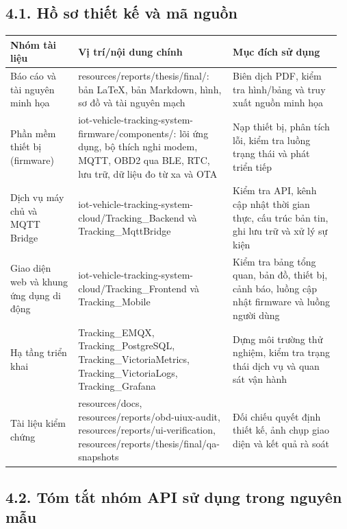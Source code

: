 \documentclass[a4paper]{extarticle}
\newcounter{none} %
\newcommand{\thesisterm}[1]{{\rmfamily #1}}
\begin{document}
\subsection{4.1. Hồ sơ thiết kế và mã nguồn}\label{app4-source-materials-cap-nhat}

{\def\LTcaptype{none} %
\begin{longtable}{|L{0.205\linewidth}|L{0.435\linewidth}|L{0.320\linewidth}|}
\hline
\textbf{Nhóm tài liệu} & \textbf{Vị trí/nội dung chính} & \textbf{Mục đích sử dụng} \\
\hline
\endhead
\endfoot
\endlastfoot
Báo cáo và tài nguyên minh họa & \thesisterm{resources/reports/thesis/final/}: bản LaTeX, bản Markdown, hình, sơ đồ và tài nguyên mạch & Biên dịch PDF, kiểm tra hình/bảng và truy xuất nguồn minh họa \\\hline
Phần mềm thiết bị (firmware) & \thesisterm{iot-vehicle-tracking-system-firmware/components/}: lõi ứng dụng, bộ thích nghi modem, MQTT, OBD2 qua BLE, RTC, lưu trữ, dữ liệu đo từ xa và OTA & Nạp thiết bị, phân tích lỗi, kiểm tra luồng trạng thái và phát triển tiếp \\\hline
Dịch vụ máy chủ và MQTT Bridge & \thesisterm{iot-vehicle-tracking-system-cloud/Tracking\_Backend} và \thesisterm{Tracking\_MqttBridge} & Kiểm tra API, kênh cập nhật thời gian thực, cấu trúc bản tin, ghi lưu trữ và xử lý sự kiện \\\hline
Giao diện web và khung ứng dụng di động & \thesisterm{iot-vehicle-tracking-system-cloud/Tracking\_Frontend} và \thesisterm{Tracking\_Mobile} & Kiểm tra bảng tổng quan, bản đồ, thiết bị, cảnh báo, luồng cập nhật firmware và luồng người dùng \\\hline
Hạ tầng triển khai & \thesisterm{Tracking\_EMQX}, \thesisterm{Tracking\_PostgreSQL}, \thesisterm{Tracking\_VictoriaMetrics}, \thesisterm{Tracking\_VictoriaLogs}, \thesisterm{Tracking\_Grafana} & Dựng môi trường thử nghiệm, kiểm tra trạng thái dịch vụ và quan sát vận hành \\\hline
Tài liệu kiểm chứng & \thesisterm{resources/docs}, \thesisterm{resources/reports/obd-uiux-audit}, \thesisterm{resources/reports/ui-verification}, \thesisterm{resources/reports/thesis/final/qa-snapshots} & Đối chiếu quyết định thiết kế, ảnh chụp giao diện và kết quả rà soát \\\hline
\end{longtable}
}

\subsection{4.2. Tóm tắt nhóm API sử dụng trong nguyên mẫu}\label{app4-api-groups-cap-nhat}
\end{document}
